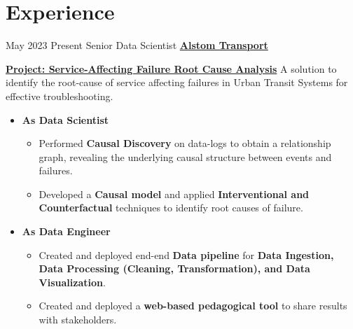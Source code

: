 \documentclass[letterpaper]{DS_class_file} %
\begin{document}
\makeprofile %



\section{\faCogs Experience}

\begin{twenty}
    \twentyitem
        {May 2023}
		{Present}
		{Senior Data Scientist}
		{\href{https://www.alstom.com/alstom-india}{\textbf{Alstom Transport}}}
		{}
		{\underline{\textbf{Project: Service-Affecting Failure Root Cause Analysis}}
        \vspace{0.1cm} 
        \newline
        A solution to identify the root-cause of service affecting failures in Urban Transit Systems for effective troubleshooting. %
        \begin{itemize}
        \item \textbf{As Data Scientist} 
        \begin{itemize}
            \item Performed \textbf{Causal Discovery} on data-logs to obtain a relationship graph, revealing the underlying causal structure between events and failures.
            \item Developed a \textbf{Causal model} and applied \textbf{Interventional and Counterfactual} techniques to identify root causes of failure.
        \end{itemize}
        \item \textbf{As Data Engineer} 
        \begin{itemize}
            \item Created and deployed end-end \textbf{Data pipeline} for \textbf{Data Ingestion, Data Processing (Cleaning, Transformation), and Data Visualization}.
            \item Created and deployed a \textbf{web-based pedagogical tool} to share results with stakeholders.

\end{itemize}
\end{itemize}}
\end{twenty}
\end{document}
